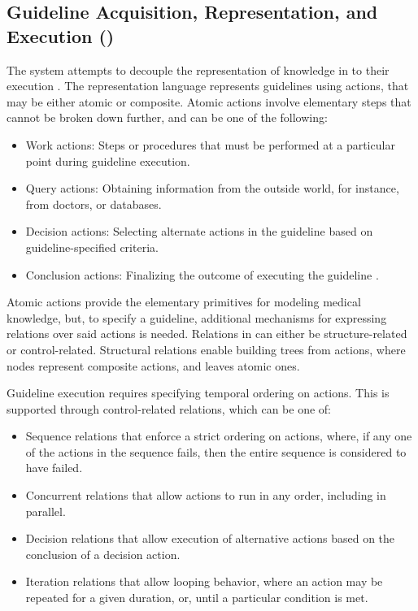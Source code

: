 \subsection{Guideline Acquisition, Representation, and Execution (\GLARE{})}\label{sec:glare}

The \GLARE{} system attempts to decouple the representation of knowledge
in \BPGs{} to their execution \cite{TerenzianiAIM01}. The \GLARE{} representation
language represents guidelines using actions, that may be either atomic or
composite. Atomic actions involve elementary steps that cannot be broken
down further, and can be one of the following:
\begin{itemize}
  \item Work actions: Steps or procedures that must be
    performed at a particular point during guideline execution.
  \item Query actions: Obtaining information from the outside world,
    for instance, from doctors, or databases.
  \item Decision actions: Selecting alternate actions in the guideline
    based on guideline-specified criteria.
  \item Conclusion actions: Finalizing the outcome of
    executing the guideline .
\end{itemize}
Atomic actions provide the elementary primitives for modeling
medical knowledge, but, to specify a guideline, additional mechanisms for
expressing relations over said actions is needed. Relations in
\GLARE{} can either be structure-related or control-related.
Structural relations enable building trees from actions, where
nodes represent composite actions, and leaves atomic ones.

Guideline execution requires specifying temporal ordering on
actions. This is supported through control-related relations, which
can be one of:
\begin{itemize}
  \item Sequence relations that enforce a strict ordering on actions, where,
    if any one of the actions in the sequence fails, then the entire sequence
    is considered to have failed.
  \item Concurrent relations that allow actions to run in any order, including
    in parallel.
  \item Decision relations that allow execution of alternative actions based
    on the conclusion of a decision action.
  \item Iteration relations that allow looping behavior, where
    an action may be repeated for a given duration, or, until a particular
    condition is met.
\end{itemize}


